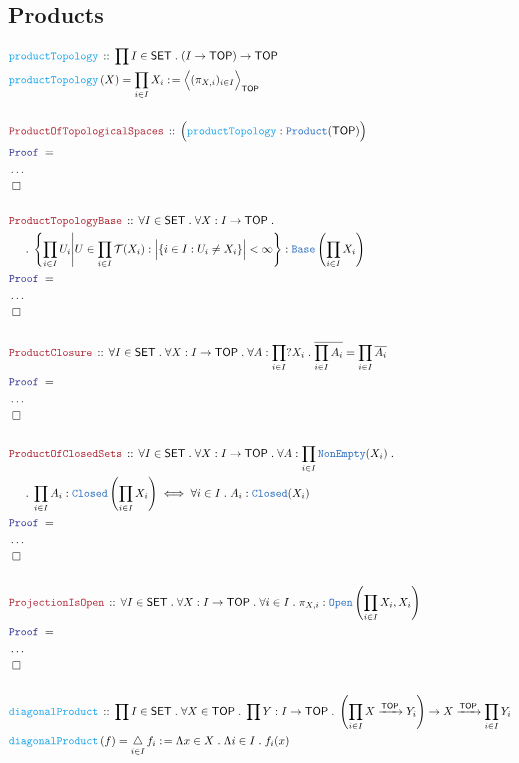 \documentclass[12pt]{scrartcl}
\newcommand{\TYPE}[1]{\textcolor{NavyBlue}{\mathtt{#1}}}
\newcommand{\FUNC}[1]{\textcolor{Cerulean}{\mathtt{#1}}}
\newcommand{\LOGIC}[1]{\textcolor{Blue}{\mathtt{#1}}}
\newcommand{\THM}[1]{\textcolor{Maroon}{\mathtt{#1}}}
\renewcommand{\.}{\; . \;}
\newcommand{\de}{: \kern 0.1pc =}
\newcommand{\Act}[1]{\left( #1 \right)}
\newcommand{\Theorem}[2]{& \THM{#1} \, :: \, #2 \\ & \Proof = \\ }
\newcommand{\DeclareFunc}[2]{& \FUNC{#1} \, :: \, #2 \\}
\newcommand{\DefineNamedFunc}[4]{&  \FUNC{#1}\Act{#2} = #3 \de #4 \\}
\newcommand{\NewLine}{\\ & \kern 1pc}
\newcommand{\Page}[1]{ \begin{align*} #1 \end{align*}   }
\newcommand{\NoProof}{ & \ldots \\ \EndProof}
\newcommand{\Arrow}{\xrightarrow}
\newcommand{\QED}{\; \square}
\newcommand{\EndProof}{& \QED \\}
\newcommand{\Proof}{\LOGIC{Proof} \; }
\newcommand{\SET}{\mathsf{SET}}
\DeclareMathOperator{\diag}{\triangle}
\newcommand{\TOP}{\mathsf{TOP}}
\newcommand{\T}{\mathcal{T}}
\begin{document}
\subsection{Products}
\Page{
	\DeclareFunc{productTopology}
	{
		\prod I \in \SET \.
		(I \to \TOP) \to \TOP
	}
	\DefineNamedFunc{productTopology}{X}{\prod_{i \in I} X_i}
	{ \Big\langle ( \pi_{X,i} )_{i \in I} \Big\rangle_{\TOP}  }
	\\
	\Theorem{ProductOfTopologicalSpaces}
	{
		\Big( \FUNC{productTopology} : \TYPE{Product}(\TOP)  \Big) 
	}
	\NoProof
	\\
	\Theorem{ProductTopologyBase}
	{
		\forall I \in \SET \.
		\forall X : I \to \TOP \. \NewLine \. 
		\left\{ \prod_{i \in I} U_i 
			\Bigg|  U \in \prod_{i \in I} \T(X_i) : 
			\Big|\{ i \in I : U_i \neq X_i\}\Big| <\infty    
		\right\} : \TYPE{Base}\left( \prod_{i \in I} X_i \right)
	}
	\NoProof
	\\
	\Theorem{ProductClosure}
	{
		\forall I \in \SET \.
		\forall X : I \to \TOP \.
		\forall A : \prod_{i \in I} ?X_i \.
		\overline{\prod_{i\in I} A_i} = \prod_{i \in I} \overline{A_i}
	}
	\NoProof
	\\
	\Theorem{ProductOfClosedSets}
	{
		\forall I \in \SET \.
		\forall X : I \to \TOP \.
		\forall A : \prod_{i \in I} \TYPE{NonEmpty}(X_i) \. \NewLine \. 
		\prod_{i \in I} A_i : \TYPE{Closed}\left( \prod_{i \in I} X_i\right) \iff 
		\forall i \in I \.  A_i : \TYPE{Closed}(X_i) 
	}
	\NoProof
	\\
	\Theorem{ProjectionIsOpen}
	{
		\forall I \in \SET \.
		\forall X : I \to \TOP \.
		\forall i \in I \.
		\pi_{X,i} : \TYPE{Open}\left( \prod_{i \in I} X_i, X_i \right)
	}
	\NoProof
	\\
	\DeclareFunc{diagonalProduct}
	{
		\prod I \in \SET \.
		\forall X \in \TOP \.
		\prod Y : I \to \TOP \.
		\left( \prod_{i \in I} X \Arrow{\TOP} Y_i \right) \to
		X \Arrow{\TOP} \prod_{i \in I} Y_i
	}
	\DefineNamedFunc{diagonalProduct}{f}{\diag_{i \in I} f_i}{ \Lambda x \in X \. \Lambda i \in I \. f_i(x)}
}
\end{document}
